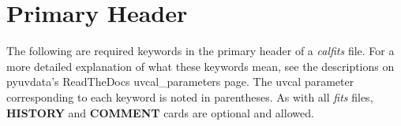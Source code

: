 \documentclass[11pt, oneside]{article}   	%
\begin{document}
\section{Primary Header}
The following are required keywords in the primary header of a \emph{calfits} file.
For a more detailed explanation of what these keywords mean, see the descriptions on pyuvdata's ReadTheDocs uvcal\_parameters page. The uvcal parameter corresponding to each keyword is noted in parentheses. 
As with all \emph{fits} files, \textbf{HISTORY} and \textbf{COMMENT} cards are optional and allowed.
\end{document}
